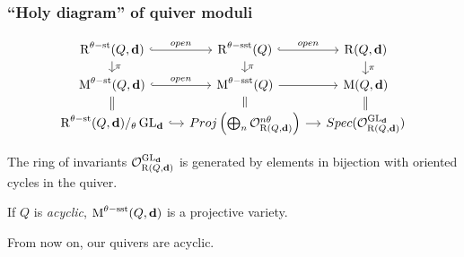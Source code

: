 \documentclass{beamer}
\begin{document}
\begin{frame}
    \frametitle{``Holy diagram'' of quiver moduli}
    \[\begin{tikzcd}[row sep=small, column sep=small, ampersand replacement=\&]
        \parameterspace^{\theta\stable}(Q, \tuple{d}) \arrow[r, hook, "open"] \arrow[d, "\pi"]   \& \parameterspace^{\theta\semistable}(Q) \arrow[r, hook, "open"] \arrow[d, "\pi"]                                   \& \parameterspace(Q, \tuple{d}) \arrow[d, "\pi"] \\ 
        \modulispace^{\theta\stable}(Q, \tuple{d}) \arrow[r, hook, "open"] \arrow[d, equal]    \&  \modulispace^{\theta\semistable}(Q) \arrow[r] \arrow[d, equal]                                       \& \modulispace(Q, \tuple{d}) \arrow[d, equal] \\
        \parameterspace^{\theta\stable}(Q, \tuple{d}) /_\theta \GL_{\tuple{d}} \arrow[r, hook]           \&  Proj \left(\bigoplus_{n} \mathcal{O}_{\parameterspace(Q, \tuple{d})}^{n\theta}\right) \arrow[r]    \& Spec(\mathcal{O}_{\parameterspace(Q, \tuple{d})}^{\GL_{\tuple{d}}})
    \end{tikzcd} \] \pause
\begin{lemma}
    The ring of invariants $\mathcal{O}^{\operatorname{GL}_{\mathbf{d}}}_{\operatorname{R}(Q, \mathbf{d})}$
    is generated by elements in bijection with oriented cycles in the quiver.
\end{lemma} \pause
\begin{corollary}
    If $Q$ is \emph{acyclic}, $\operatorname{M}^{\theta-\mathrm{sst}}(Q, \mathbf{d})$ is a projective variety.
\end{corollary} \pause
From now on, our quivers are acyclic.
\end{frame}
\end{document}
